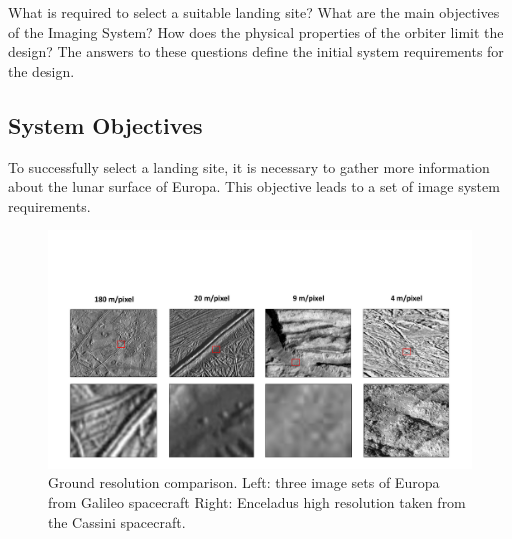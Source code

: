 What is required to select a suitable landing site? What are the main objectives of the Imaging System? How does the physical properties of the orbiter limit the design? The answers to these questions define the initial system requirements for the design.
\subsection{System Objectives}
To successfully select a landing site, it is necessary to gather more information about the lunar surface of Europa. This objective leads to a set of image system requirements. 
\begin{figure}[htb!]
\centering
\includegraphics[width=1\textwidth,page=1,trim=10mm 5mm 15mm 50mm,clip]{figures/Orbiter/highres.pdf}
\caption{Ground resolution comparison. Left: three image sets of Europa from Galileo spacecraft Right: Enceladus high resolution taken from the Cassini spacecraft.}
\label{fig:highres_compare}
\end{figure}
